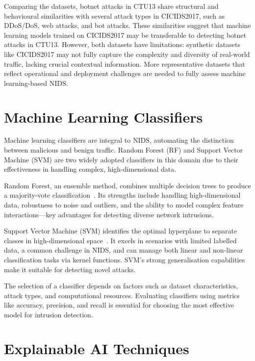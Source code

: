 Comparing the datasets, botnet attacks in CTU13 share structural and behavioural similarities with several attack types in CICIDS2017, such as DDoS/DoS, web attacks, and bot attacks. These similarities suggest that machine learning models trained on CICIDS2017 may be transferable to detecting botnet attacks in CTU13. However, both datasets have limitations: synthetic datasets like CICIDS2017 may not fully capture the complexity and diversity of real-world traffic, lacking crucial contextual information. More representative datasets that reflect operational and deployment challenges are needed to fully assess machine learning-based NIDS.

\section{Machine Learning Classifiers}\label{sec:classifiers}

Machine learning classifiers are integral to NIDS, automating the distinction between malicious and benign traffic. Random Forest (RF) and Support Vector Machine (SVM) are two widely adopted classifiers in this domain due to their effectiveness in handling complex, high-dimensional data.

Random Forest, an ensemble method, combines multiple decision trees to produce a majority-vote classification~\cite{hastie2009random}. Its strengths include handling high-dimensional data, robustness to noise and outliers, and the ability to model complex feature interactions—key advantages for detecting diverse network intrusions.

Support Vector Machine (SVM) identifies the optimal hyperplane to separate classes in high-dimensional space~\cite{cortes1995support}. It excels in scenarios with limited labelled data, a common challenge in NIDS, and can manage both linear and non-linear classification tasks via kernel functions. SVM’s strong generalisation capabilities make it suitable for detecting novel attacks.

The selection of a classifier depends on factors such as dataset characteristics, attack types, and computational resources. Evaluating classifiers using metrics like accuracy, precision, and recall is essential for choosing the most effective model for intrusion detection.

\section{Explainable AI Techniques}\label{sec:explainable}

